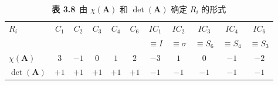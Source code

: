 \begin{table}[H]
\centering
\caption*{\textbf{表 3.8}\ 由 $\chi(\mathbf{A})$ 和 $\det(\mathbf{A})$ 确定 $R_{i}$ 的形式}
\begin{tabular}{@{}lcccccccccc@{}}
\toprule
$R_{i}$ & $C_{1}$ & $C_{2}$ & $C_{3}$ & $C_{4}$ & $C_{6}$ & $IC_{1}$ & $IC_{2}$ & $IC_{3}$ & $IC_{4}$ & $IC_{6}$\\
 & & & & & & $\equiv I$ & $\equiv\sigma$ & $\equiv S_{6}$ & $\equiv S_{4}$ & $\equiv S_{3}$\\
\midrule
$\chi(\mathbf{A})$ & $3$ & $-1$ & $0$ & $1$ & $2$ & $-3$ & $1$ & $0$ & $-1$ & $-2$\\
$\det(\mathbf{A})$ & $+1$ & $+1$ & $+1$ & $+1$ & $+1$ & $-1$ & $-1$ & $-1$ & $-1$ & $-1$\\
\bottomrule
\end{tabular}
\end{table}

